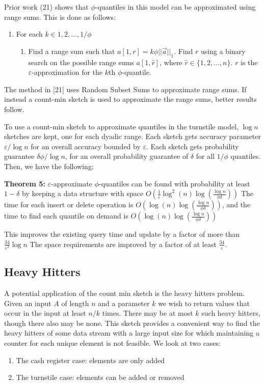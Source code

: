 \documentclass[11pt]{article}
\begin{document}
{Prior work (21) shows that $\phi$-quantiles in this model can be approximated using range sums. This is done
as follows:
\begin{enumerate}
    \item For each $k \in {1, 2, \dots, 1/\phi}$
    \begin{enumerate}
        \item Find a range sum such that $a[1, r] = k\phi||\vec{a}||_1$. Find $r$ using a binary
        search on the possible range sums $a[1, \hat{r}]$, where $\hat{r} \in \{1, 2, \dots, n\}$.  $r$ is the
        $\varepsilon$-approximation for the $k$th $\phi$-quantile.
    \end{enumerate}
\end{enumerate}
The method in [21] uses Random Subset Sums to approximate range sums.  If instead a count-min
sketch is used to approximate the range sums, better results follow.  

To use a count-min sketch to approximate quantiles in the turnstile model, $\log n$ sketches are kept,
one for each dyadic range. Each sketch gets accuracy parameter $\varepsilon/\log n$ for an overall accuracy
bounded by $\varepsilon$. Each sketch gets probability guarantee $\delta\phi/\log n$, for
an overall probability guarantee of $\delta$ for all $1/\phi$ quantiles. Then, we have the following:

\textbf{Theorem 5:} $\varepsilon$-approximate $\phi$-quantiles can be found with probability at least
$1 - \delta$ by keeping a data structure with space $O\left(\frac{1}{\varepsilon}
\log^2(n) \log \left(\frac{\log n}{\phi \delta}\right)\right)$ The time for each insert or delete operation is
$O\left(\log(n) \log \left(\frac{\log n}{\phi \delta}\right)\right)$, and the time to find each quantile on demand 
is $O\left(\log(n)\log\left(\frac{\log n}{\phi \delta}\right)\right)$

This improves the existing query time and update by a factor of more than $\frac{34}{\varepsilon^2} \log n$
The space requirements are improved by a factor of at least $\frac{34}{\varepsilon}$. 

\subsection{Heavy Hitters}
A potential application of the count min sketch is the heavy hitters problem. Given an input $A$ of length $n$ and a parameter $k$ we wish to return values that occur in the input at least $n/k$ times. There may be at most $k$ such heavy hitters, though there also may be none. This sketch provides a convenient way to find the heavy hitters of some data stream with a large input size for which  maintaining a counter for each unique element is not feasible. We look at two cases:
\begin{enumerate}
\item The cash register case: elements are only added
\item The turnstile case: elements can be added or removed
\end{enumerate}

}
\end{document}
